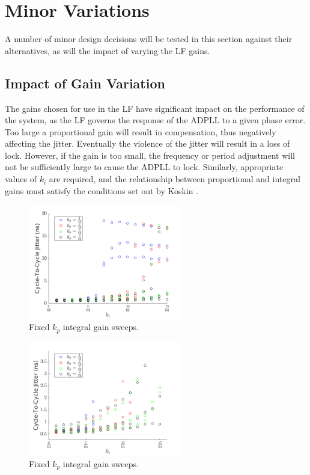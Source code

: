 \section{Minor Variations}\label{section:minor_variations}
A number of minor design decisions will be tested in this section against their alternatives, as will the impact of varying the \ac{LF} gains.

\subsection{Impact of Gain Variation}
The gains chosen for use in the \acl{LF} have significant impact on the performance of the system, as the \ac{LF} governs the response of the \ac{ADPLL} to a given phase error. Too large a proportional gain will result in compensation, thus negatively affecting the jitter. Eventually the violence of the jitter will result in a loss of lock. However, if the gain is too small, the frequency or period adjustment will not be sufficiently large to cause the \ac{ADPLL} to lock. Similarly, appropriate values of $k_i$ are required, and the relationship between proportional and integral gains must satisfy the conditions set out by Koskin \cite{koskin2018generation}.

\begin{figure}[h]
    \centering
    \includegraphics[width=0.6\textwidth]{../fixed_kp.png}
    \caption[Fixed $k_p$ integral gain sweeps]{Fixed $k_p$ integral gain sweeps.}
    \label{fig:gain_sweep}
\end{figure}
\begin{figure}[h]
    \centering
    \includegraphics[width=0.6\textwidth]{../fixed_kp_zoom.png} 
    \caption[Fixed $k_p$ integral gain sweeps]{Fixed $k_p$ integral gain sweeps.}
    \label{fig:gain_sweep_zoom}
\end{figure}

